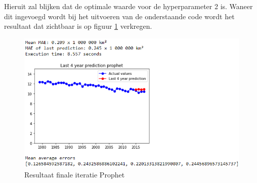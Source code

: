 Hieruit zal blijken dat de optimale waarde voor de hyperparameter 2 is. Waneer dit ingevoegd wordt bij het uitvoeren van de onderstaande code wordt het resultaat dat zichtbaar is op figuur \ref{fig:uvnsprophet} verkregen.

\begin{figure}
    \centering
    \caption{Resultaat finale iteratie Prophet}
    \label{fig:uvnsprophet}
    \includegraphics[width=1\linewidth]{uv_ns_prophet}
\end{figure}


